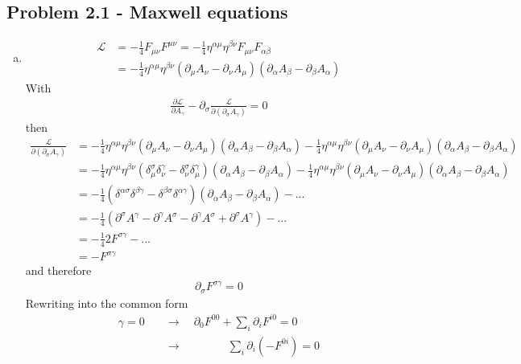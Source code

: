 \documentclass[10pt,a4paper]{book}
\theoremstyle{definition}
\begin{document}
\subsection{Problem 2.1 - Maxwell equations}
\begin{enumerate}[(a)]
\item
\begin{align}
\mathcal{L}&=-\frac{1}{4}F_{\mu\nu}F^{\mu\nu}=-\frac{1}{4}\eta^{\alpha\mu}\eta^{\beta\nu}F_{\mu\nu}F_{\alpha\beta}\\
&=-\frac{1}{4}\eta^{\alpha\mu}\eta^{\beta\nu}(\partial_\mu A_\nu-\partial_\nu A_\mu)(\partial_\alpha A_\beta-\partial_\beta A_\alpha)
\end{align}
With
\begin{align}
\frac{\partial\mathcal{L}}{\partial A_\gamma}-\partial_\sigma\frac{\mathcal{L}}{\partial(\partial_\sigma A_\gamma)}=0
\end{align}
then
\begin{align}
\frac{\mathcal{L}}{\partial(\partial_\sigma A_\gamma)}
&=-\frac{1}{4}\eta^{\alpha\mu}\eta^{\beta\nu}(\partial_\mu A_\nu-\partial_\nu A_\mu)(\partial_\alpha A_\beta-\partial_\beta A_\alpha)
-\frac{1}{4}\eta^{\alpha\mu}\eta^{\beta\nu}(\partial_\mu A_\nu-\partial_\nu A_\mu)(\partial_\alpha A_\beta-\partial_\beta A_\alpha)\\
&=-\frac{1}{4}\eta^{\alpha\mu}\eta^{\beta\nu}(\delta_\mu^\sigma\delta_\nu^\gamma-\delta_\nu^\sigma\delta_\mu^\gamma)(\partial_\alpha A_\beta-\partial_\beta A_\alpha)
-\frac{1}{4}\eta^{\alpha\mu}\eta^{\beta\nu}(\partial_\mu A_\nu-\partial_\nu A_\mu)(\partial_\alpha A_\beta-\partial_\beta A_\alpha)\\
&=-\frac{1}{4}(\delta^{\alpha\sigma}\delta^{\beta\gamma}-\delta^{\beta\sigma}\delta^{\alpha\gamma})(\partial_\alpha A_\beta-\partial_\beta A_\alpha)-...\\
&=-\frac{1}{4}(\partial^\sigma A^\gamma-\partial^\gamma A^\sigma-\partial^\gamma A^\sigma+\partial^\sigma A^\gamma)-...\\
&=-\frac{1}{4}2F^{\sigma\gamma}-...\\
&=-F^{\sigma\gamma}
\end{align}
and therefore
\begin{align}
\partial_\sigma F^{\sigma\gamma}=0
\end{align}
Rewriting into the common form
\begin{align}
\gamma=0
&\quad\rightarrow\quad\partial_0F^{00}+\sum_i\partial_iF^{i0}=0\\
&\quad\rightarrow\qquad\qquad\sum_i\partial_i(-F^{0i})=0\\

\end{align}
\end{enumerate}
\end{document}
